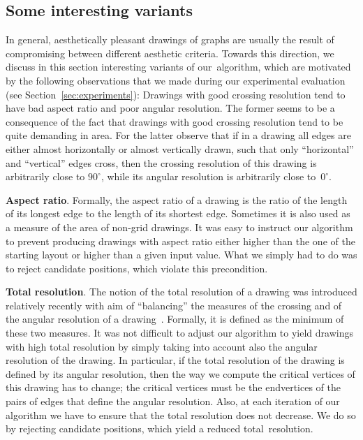 \documentclass[runningheads]{llncs}
\newcommand{\myparagraph}[1]{\smallskip\noindent\textbf{#1}.}
\begin{document}
\subsection{Some interesting variants}
\label{ssec:variants}

In general, aesthetically pleasant drawings of graphs are usually the result of compromising between different aesthetic criteria. Towards this direction, we discuss in this section interesting variants of our~algorithm, which are motivated by the following observations that we made during our experimental evaluation (see Section~\ref{sec:experiments}): Drawings with good crossing resolution tend to have bad aspect ratio 
and poor angular resolution.
The former seems to be a consequence of the fact that drawings with good crossing resolution tend to be quite demanding in area. For the latter observe that if in a drawing all edges are either almost horizontally or almost vertically drawn, such that only ``horizontal'' and ``vertical'' edges cross, then the crossing resolution of this drawing is arbitrarily close to $90^\circ$, while its angular resolution is arbitrarily close to~$0^\circ$. 

\myparagraph{Aspect ratio}
%
Formally, the aspect ratio of a drawing is the ratio of the length of its longest edge to the length of its shortest edge. Sometimes it is also used as a measure of the area of non-grid drawings. It was easy to instruct our algorithm to prevent producing drawings with aspect ratio either higher than the one of the starting layout or higher than a given input value. What we simply had to do was to reject candidate positions, which violate this precondition.  

\myparagraph{Total resolution} 
%
The notion of the total resolution of a drawing was introduced relatively recently with aim of ``balancing'' the measures of the crossing and of the angular resolution of a drawing~\cite{DBLP:journals/cj/ArgyriouBS13}. Formally, it is defined as the minimum of these two measures. It was not difficult to adjust our algorithm to yield drawings with high total resolution by simply taking into account also the angular resolution of the drawing. In particular, if the total resolution of the drawing is defined by its angular resolution, then the way we compute the critical vertices of this drawing has to change; the critical vertices must be the endvertices of the pairs of edges that define the angular resolution. Also, at each iteration of our algorithm we have to ensure that the total resolution does not decrease. We do so by rejecting candidate positions, which yield a reduced total~resolution.
\end{document}
